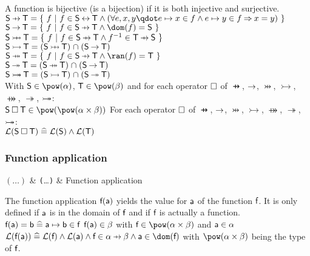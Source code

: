 \begin{samepage}
\begin{rodinrefentry}
  A function is bijective (is a bijection) if it is both injective and surjective.
  \rrdef
  $\exprs \pfun \exprt = \{~ f ~|~ f\in \exprs\rel \exprt \land (\forall e,x,y \qdot e\mapsto x\in f \land e\mapsto y\in f \limp x=y) ~\}$\\
  $\exprs \tfun \exprt = \{~ f ~|~ f\in \exprs\pfun \exprt \land \dom(f) = \exprs ~\}$\\
  $\exprs \pinj \exprt = \{~ f ~|~ f\in \exprs\pfun \exprt \land f^{-1} \in  \exprt\pfun \exprs ~\}$\\
  $\exprs \tinj \exprt = (\exprs\pinj \exprt) \binter (\exprs\tfun \exprt)$\\
  $\exprs \psur \exprt = \{~ f ~|~ f\in \exprs\pfun \exprt \land \ran(f) = \exprt ~\}$\\
  $\exprs \tsur \exprt = (\exprs\psur \exprt) \binter (\exprs\tfun \exprt)$\\
  $\textsf{S} \mathbin{ \rightarrowtail \mkern-18mu\twoheadrightarrow} \textsf{T} = (\textsf{S}\mathbin\rightarrowtail \textsf{T}) \mathbin{\mkern1mu\cap\mkern1mu} (\textsf{S}\mathbin\twoheadrightarrow \textsf{T})$\\
  \rrtypes
  With $\exprs\in\pow(\alpha)$, $\exprt\in\pow(\beta)$ and for each operator $\mathbin{\Box}$ of $\pfun$, $\mathbin\rightarrow$, $\pinj$, $\tinj$, $\psur$, $\tsur$, $\mathbin{ \rightarrowtail \mkern-18mu\twoheadrightarrow}$:\\
  $\exprs \opelipse \exprt \in \pow(\pow(\alpha\cprod\beta))$
  \rrwd
  For each operator $\mathbin{\Box}$ of $\pfun$, $\mathbin\rightarrow$, $\pinj$, $\tinj$, $\psur$, $\tsur$, $\mathbin{ \rightarrowtail \mkern-18mu\twoheadrightarrow}$:\\
  $\mathcal{L}(\textsf{S}\mathbin{\Box} \textsf{T}) \mathrel{\widehat=} \mathcal{L}(\textsf{S}) \land \mathcal{L}(\textsf{T})$
\end{rodinrefentry}
\end{samepage}

\begin{samepage}
\subsubsection{Function application}
\label{function_application}
\begin{rrnames}
  $(\ldots)$  & \texttt{(}\ldots\texttt{)}  & Function application
\end{rrnames}
\begin{rodinrefentry}
  \rrdesc
    The function application $\textsf{f}(\textsf{a})$ yields the value for $\textsf{a}$ of the function $\textsf{f}$.
    It is only defined if $\textsf{a}$ is in the domain of $\textsf{f}$ and if $\textsf{f}$ is actually a function.
  \rrdef
    $\textsf{f}(\textsf{a}) = \textsf{b} \mathrel{\widehat=} \textsf{a} \mapsto \textsf{b}\in \textsf{f}$
  \rrtypes
    $\textsf{f}(\textsf{a})\in\beta$ with $\exprlf\in\pow(\alpha\cprod\beta)$ and $\textsf{a}\in\alpha$
  \rrwd
    $\wdl(\exprlf(\exprla))\defi\wdl(\exprlf)\land\wdl(\exprla)\land\exprlf\in\alpha\pfun\beta \land \exprla\in\dom(\exprlf)$
    with $\pow(\alpha\cprod\beta)$ being the type of $\textsf{f}$.
\end{rodinrefentry}
\end{samepage}

